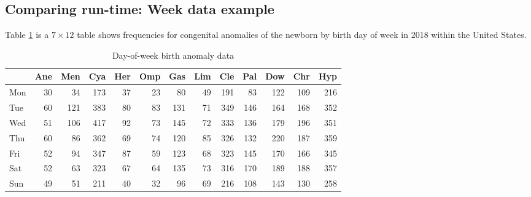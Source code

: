 \documentclass[article,nojss]{jss}\usepackage[]{graphicx}\usepackage[]{color}
\begin{document}
\subsection{Comparing run-time: Week data example}\label{fisher_week}
Table \ref{tab:week} is a $7 \times 12$ table shows frequencies for congenital anomalies of the newborn by birth day of week in 2018 within the United States. 


\begin{table}

\caption{\label{tab:weekdata}Day-of-week birth anomaly data\label{tab:week}}
\centering
\begin{tabular}[t]{lrrrrrrrrrrrr}
\toprule
  & Ane & Men & Cya & Her & Omp & Gas & Lim & Cle & Pal & Dow & Chr & Hyp\\
\midrule
Mon & 30 & 34 & 173 & 37 & 23 & 80 & 49 & 191 & 83 & 122 & 109 & 216\\
Tue & 60 & 121 & 383 & 80 & 83 & 131 & 71 & 349 & 146 & 164 & 168 & 352\\
Wed & 51 & 106 & 417 & 92 & 73 & 145 & 72 & 333 & 136 & 179 & 196 & 351\\
Thu & 60 & 86 & 362 & 69 & 74 & 120 & 85 & 326 & 132 & 220 & 187 & 359\\
Fri & 52 & 94 & 347 & 87 & 59 & 123 & 68 & 323 & 145 & 170 & 166 & 345\\
Sat & 52 & 63 & 323 & 67 & 64 & 135 & 73 & 316 & 170 & 189 & 188 & 357\\
Sun & 49 & 51 & 211 & 40 & 32 & 96 & 69 & 216 & 108 & 143 & 130 & 258\\
\bottomrule
\end{tabular}
\end{table}
\end{document}
